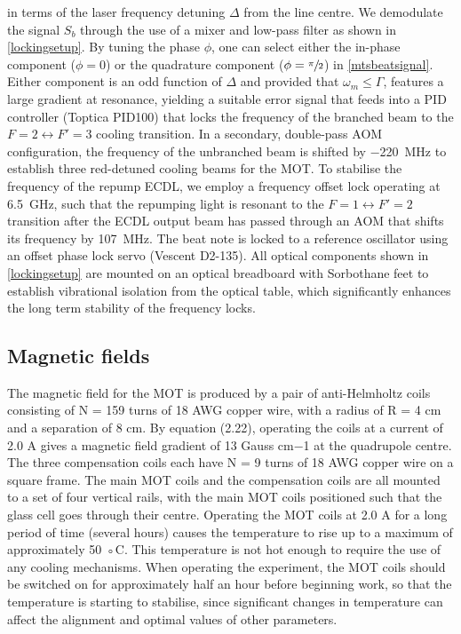 \documentclass[../Thesis-IJspeert.tex]{subfiles}
\begin{document}
in terms of the laser frequency detuning $\Delta$ from the line centre. We demodulate the signal $S_b$ through the use of a mixer and low-pass filter as shown in \autoref{lockingsetup}. By tuning the phase $\phi$, one can select either the in-phase component ($\phi=0$) or the quadrature component ($\phi=\sfrac{\pi}{2}$) in \autoref{mtsbeatsignal}. Either component is an odd function of $\Delta$ and provided that $\omega_m\le \Gamma$, features a large gradient at resonance, yielding a suitable error signal that feeds into a PID controller (Toptica PID100) that locks the frequency of the branched beam to the $ F = 2 \leftrightarrow F' = 3 $ cooling transition. In a secondary, double-pass AOM configuration, the frequency of the unbranched beam is shifted by \SI{-220}{\mega\hertz} to establish three red-detuned cooling beams for the MOT. To stabilise the frequency of the repump ECDL, we employ a frequency offset lock \cite{Schnemann1999} operating at \SI{6.5}{\giga\hertz}, such that the repumping light is resonant to the $ F = 1 \leftrightarrow F' = 2 $ transition after the ECDL output beam has passed through an AOM that shifts its frequency by \SI{+107}{\mega\hertz}. The beat note is locked to a reference oscillator using an offset phase lock servo (Vescent D2-135). All optical components shown in \autoref{lockingsetup} are mounted on an optical breadboard with Sorbothane feet to establish vibrational isolation from the optical table, which significantly enhances the long term stability of the frequency locks.

\subsection{Magnetic fields}
The magnetic field for the MOT is produced by a pair of anti-Helmholtz
coils consisting of N = 159 turns of 18 AWG copper wire, with a radius
of R = 4 cm and a separation of 8 cm. By equation (2.22), operating the
coils at a current of 2.0 A gives a magnetic field gradient of 13 Gauss cm−1
at the quadrupole centre. The three compensation coils each have N = 9
turns of 18 AWG copper wire on a square frame. The main MOT coils and
the compensation coils are all mounted to a set of four vertical rails, with
the main MOT coils positioned such that the glass cell goes through their
centre.
Operating the MOT coils at 2.0 A for a long period of time (several hours)
causes the temperature to rise up to a maximum of approximately 50 ◦C. This
temperature is not hot enough to require the use of any cooling mechanisms.
When operating the experiment, the MOT coils should be switched on for
approximately half an hour before beginning work, so that the temperature
is starting to stabilise, since significant changes in temperature can affect the
alignment and optimal values of other parameters.
\end{document}
